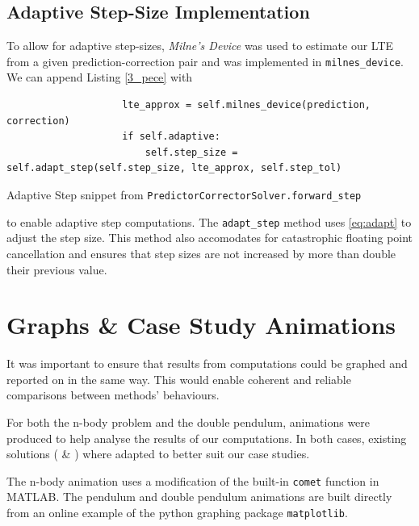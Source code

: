 \documentclass[12pt, twoside]{report}
\theoremstyle{plain}
\theoremstyle{definition}
\theoremstyle{definition}
\begin{document}
        \subsection{Adaptive Step-Size Implementation}
        \label{3_adaptive}
            To allow for adaptive step-sizes, \textit{Milne's Device} was used
            to estimate our LTE from a given prediction-correction pair and was
            implemented in \texttt{milnes_device}. We can append
            Listing \ref{3_pece} with
            \begin{listing}[H]
                \begin{verbatim}
                    lte_approx = self.milnes_device(prediction, correction)
                    if self.adaptive:
                        self.step_size = self.adapt_step(self.step_size, lte_approx, self.step_tol)
                \end{verbatim}
                \caption{Adaptive Step snippet from 
                \texttt{PredictorCorrectorSolver.forward_step}}
                \label{3_adaptive_forward}
            \end{listing}
            \noindent to enable adaptive step computations. The 
            \texttt{adapt_step} method uses \eqref{eq:adapt} to
            adjust the step size. This method also accomodates for catastrophic
            floating point cancellation and ensures that step sizes are not 
            increased by more than double their previous value.

    \section{Graphs \& Case Study Animations}
    \label{3_case_studies}
        It was important to ensure that results from computations could be 
        graphed and reported on in the same way. This would enable coherent
        and reliable comparisons between methods' behaviours. 

        For both the n-body problem and the double pendulum, animations were 
        produced to help analyse the results of our computations. In both cases,
        existing solutions (\cite{multicomet} \& \cite{pendulum}) where adapted
        to better suit our case studies.

        The n-body animation uses a modification of the built-in 
        \texttt{comet} function in MATLAB. The pendulum and double
        pendulum animations are built directly from an online example of the 
        python graphing package \texttt{matplotlib}.
\end{document}
